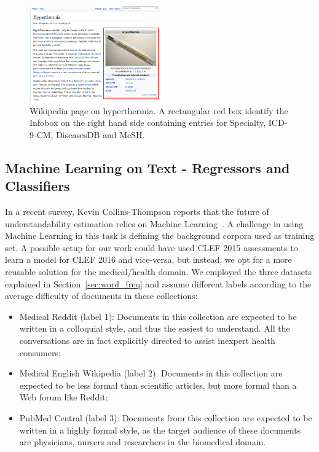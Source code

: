 \documentclass[runningheads,a4paper]{llncs}
\begin{document}
\begin{figure}[th!]
   \centering
   \includegraphics[width=0.50\textwidth]{graphics/hyperthermia}
    \caption{Wikipedia page on hyperthermia. A rectangular red box identify the Infobox on the right hand side containing entries for Specialty, ICD-9-CM, DiseasesDB and MeSH.}
    \label{fig:hyperthermia}
\end{figure}



\subsection{Machine Learning on Text - Regressors and Classifiers}

In a recent survey, Kevin Collins-Thompson reports that the future of understandability estimation relies on Machine Learning~\cite{collins2014computational}.
A challenge in using Machine Learning in this task is defining the background corpora used as training set.
A possible setup for our work could have used CLEF 2015 assessments to learn a model for CLEF 2016 and vice-versa, but instead, we opt for a 
more reusable solution for the medical/health domain. 
We employed the three datasets explained in Section~\ref{sec:word_freq} and assume different labels according to the average difficulty of documents in these collections:

\begin{itemize}
    \item Medical Reddit (label 1): Documents in this collection are expected to be written in a colloquial style, and thus the easiest to understand. All the conversations are in fact explicitly directed to assist inexpert health consumers;
    \item Medical English Wikipedia (label 2): Documents in this collection are expected to be less formal than scientific articles, but more formal than a Web forum like Reddit;
    \item PubMed Central (label 3): Documents from this collection are expected to be written in a highly formal style, as the target audience of these documents are physicians, nursers and researchers in the biomedical domain.
\end{itemize}
\end{document}
